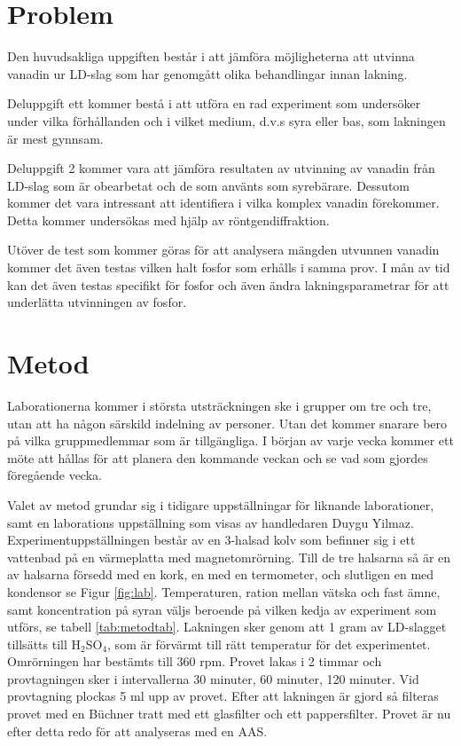 \documentclass{article}
\begin{document}
\section{Problem}
Den huvudsakliga uppgiften består i att jämföra möjligheterna att utvinna vanadin ur LD-slag som har genomgått olika behandlingar innan lakning.

Deluppgift ett kommer bestå i att utföra en rad experiment som undersöker under vilka förhållanden och i vilket medium, d.v.s syra eller bas, som lakningen är mest gynnsam.


Deluppgift 2 kommer vara att jämföra resultaten av utvinning av vanadin från LD-slag som är obearbetat och de som använts som syrebärare. Dessutom kommer det vara intressant att identifiera i vilka komplex vanadin förekommer. Detta kommer undersökas med hjälp av röntgendiffraktion.

Utöver de test som kommer göras för att analysera mängden utvunnen vanadin kommer det även testas vilken halt fosfor som erhålls i samma prov.
I mån av tid kan det även testas specifikt för fosfor och även ändra lakningsparametrar för att underlätta utvinningen av fosfor.
\newpage
\section{Metod}

Laborationerna kommer i största utsträckningen ske i grupper om tre och tre, utan att ha någon särskild indelning av personer. Utan det kommer snarare bero på vilka gruppmedlemmar som är tillgängliga. I början av varje vecka kommer ett möte att hållas för att planera den kommande veckan och se vad som gjordes föregående vecka. 

Valet av metod grundar sig i tidigare uppställningar för liknande laborationer, samt en laborations uppställning som visas av handledaren Duygu Yilmaz\cite{Aarabi-Karasgani2010}. Experimentuppställningen består av en 3-halsad kolv som befinner sig i ett vattenbad på en värmeplatta med magnetomrörning. Till de tre halsarna så är en av halsarna försedd med en kork, en med en termometer, och slutligen en med kondensor se Figur \ref{fig:lab}. Temperaturen, ration mellan vätska och fast ämne, samt koncentration på syran väljs beroende på vilken kedja av experiment som utförs, se tabell \ref{tab:metodtab}. Lakningen sker genom att 1 gram av LD-slagget tillsätts till H$_{2}$SO$_{4}$, som är förvärmt till rätt temperatur för det experimentet. Omrörningen har bestämts till 360 rpm. Provet lakas i 2 timmar och provtagningen sker i intervallerna 30 minuter, 60 minuter, 120 minuter. Vid provtagning plockas 5 ml upp av provet. Efter att lakningen är gjord så filteras provet med en Büchner tratt med ett glasfilter och ett pappersfilter. Provet är nu efter detta redo för att analyseras med en AAS. 
\end{document}
